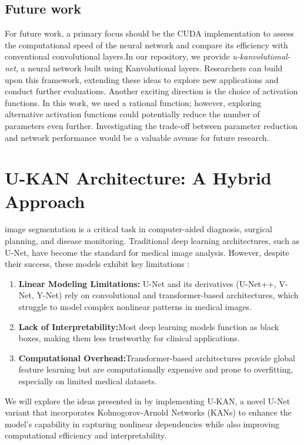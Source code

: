 \documentclass[conference]{IEEEtran}
\begin{document}
\subsection{Future work}

For future work, a primary focus should be the CUDA implementation to assess
the computational speed of the neural network and compare its efficiency with
conventional convolutional layers.In our repository, we provide
\textit{u-kanvolutional-net}, a neural network built using Kanvolutional
layers. Researchers can build upon this framework, extending these ideas to
explore new applications and conduct further evaluations. Another exciting
direction is the choice of activation functions. In this work, we used a
rational function; however, exploring alternative activation functions could
potentially reduce the number of parameters even further. Investigating the
trade-off between parameter reduction and network performance would be a
valuable avenue for future research.

\section{U-KAN Architecture: A Hybrid Approach}

 image segmentation is a critical task in computer-aided diagnosis, surgical planning, and disease monitoring. Traditional deep learning architectures, such as U-Net, have become the standard for medical image analysis. However, despite their success, these models exhibit key limitations :

\setlength{\parskip}{0pt}
\begin{enumerate}[label=\arabic*.] %
    \item \textbf{Linear Modeling Limitations:} U-Net and its derivatives (U-Net++, V-Net, Y-Net) rely on convolutional and transformer-based architectures, which struggle to model complex nonlinear patterns in medical images.
    \item \textbf{Lack of Interpretability:}Most deep learning models function as black boxes, making them less trustworthy for clinical applications.
    \item \textbf{Computational Overhead:}Transformer-based architectures provide global feature learning but are computationally expensive and prone to overfitting, especially on limited medical datasets.
\end{enumerate}

We will explore the ideas presented in \cite{arxiv2406} by implementing U-KAN,
a novel U-Net variant that incorporates Kolmogorov-Arnold Networks (KANs) to
enhance the model’s capability in capturing nonlinear dependencies while also
improving computational efficiency and interpretability.
\end{document}
